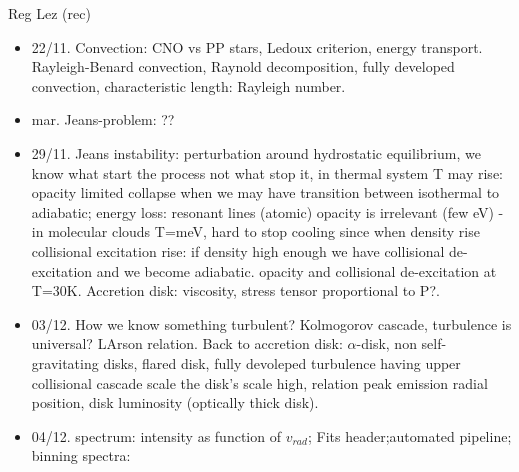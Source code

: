\begin{frame}[allowframebreaks]{Reg Lez (rec)}
\begin{itemize}
\item 22/11. Convection: CNO vs PP stars, Ledoux criterion, energy transport. Rayleigh-Benard convection, Raynold decomposition, fully developed convection, characteristic length: Rayleigh number.

\item mar. Jeans-problem: ??

\item 29/11. Jeans instability: perturbation around hydrostatic equilibrium, we know what start the process not what stop it, in thermal system T may rise: opacity limited collapse when we may have transition between isothermal to adiabatic; energy loss: resonant lines (atomic) opacity is irrelevant (few eV) - in molecular clouds T=meV, hard to stop cooling since when density rise collisional excitation rise: if density high enough we have collisional de-excitation and we become adiabatic. 
opacity and collisional de-excitation at T=30K. Accretion disk: viscosity, stress tensor proportional to P?.

\item 03/12. How we know something turbulent? Kolmogorov cascade, turbulence is universal? LArson relation. Back to accretion disk: $\alpha$-disk, non self-gravitating disks, flared disk, fully devoleped turbulence having upper collisional cascade scale the disk's scale high, relation peak emission radial position, disk luminosity (optically thick disk).

\item 04/12. spectrum: intensity as function of $v_{rad}$; Fits header;automated pipeline; binning spectra: 

\end{itemize}

\end{frame}